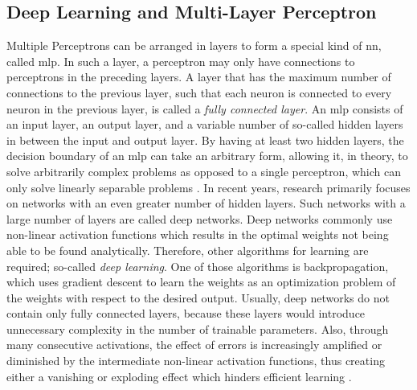 \subsection{Deep Learning and Multi-Layer Perceptron}
Multiple Perceptrons can be arranged in layers to form a special kind of \ac{nn}, called \ac{mlp}. In such a layer, a perceptron may only have connections to perceptrons in the preceding layers. A layer that has the maximum number of connections to the previous layer, such that each neuron is connected to every neuron in the previous layer, is called a \emph{fully connected layer}. An \ac{mlp} consists of an input layer, an output layer, and a variable number of so-called hidden layers in between the input and output layer. By having at least two hidden layers, the decision boundary of an \ac{mlp} can take an arbitrary form, allowing it, in theory, to solve arbitrarily complex problems as opposed to a single perceptron, which can only solve linearly separable problems \cite{Lapedes1988}. In recent years, research primarily focuses on networks with an even greater number of hidden layers. Such networks with a large number of layers are called deep networks. Deep networks commonly use non-linear activation functions which results in the optimal weights not being able to be found analytically. Therefore, other algorithms for learning are required; so-called \emph{deep learning}. One of those algorithms is backpropagation, which uses gradient descent to learn the weights as an optimization problem of the weights with respect to the desired output. Usually, deep networks do not contain only fully connected layers, because these layers would introduce unnecessary complexity in the number of trainable parameters. Also, through many consecutive activations, the effect of errors is increasingly amplified or diminished by the intermediate non-linear activation functions, thus creating either a vanishing or exploding effect which hinders efficient learning \cite{Hanin2018}.

